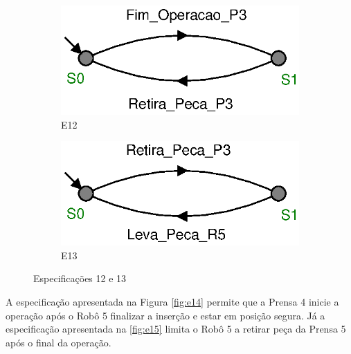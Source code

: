 \begin{figure}[H]%
  \centering
  \begin{subfigure}{0.45\textwidth}
      \centering
      \includegraphics[width=\textwidth]{imagens/E12.eps}
      \caption{E12}
      \label{fig:e12}
  \end{subfigure}
  \hfill
  \begin{subfigure}{0.45\textwidth}
      \centering
      \includegraphics[width=\textwidth]{imagens/E13.eps}
      \caption{E13}
      \label{fig:e13}
  \end{subfigure}
  \caption{Especificações 12 e 13}
  \label{fig:e1213}
\end{figure}

A especificação apresentada na Figura \ref{fig:e14} permite que a Prensa 4 inicie a operação após o Robô 5 finalizar a inserção e estar em posição segura.
Já a especificação apresentada na \ref{fig:e15} limita o Robô 5 a retirar peça da Prensa 5 após o final da operação.

